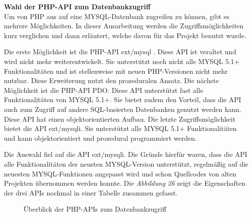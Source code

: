 \textbf{Wahl der PHP-API zum Datenbankzugriff}\\
Um von PHP aus auf eine MYSQL-Datenbank zugreifen zu können, gibt es mehrere Möglichkeiten. In dieser Ausarbeitung werden die Zugriffsmöglichkeiten kurz verglichen und dann erläutert, welche davon für das Projekt benutzt wurde.

Die erste Möglichkeit ist die PHP-API \glqq ext/mysql \grqq{}. Diese API ist veraltet und wird nicht mehr weiterentwickelt. Sie unterstützt noch nicht alle MYSQL 5.1+ Funktionalitäten und ist stellenweise mit neuen PHP-Versionen nicht mehr nutzbar. Diese Erweiterung nutzt den prozeduralen Ansatz. Die nächste Möglichkeit ist die PHP-API \glqq PDO\grqq{}. Diese API unterstützt fast alle Funktionalitäten von MYSQL 5.1+. Sie bietet zudem den Vorteil, dass die API auch zum Zugriff auf andere SQL-basierten Datenbanken genutzt werden kann. Diese API hat einen objektorientierten Aufbau.  Die letzte Zugriffsmöglichkeit bietet die API \glqq ext/mysqli\grqq{}. Sie unterstützt alle MYSQL 5.1+ Funktionalitäten und kann objektorientiert und prozedural programmiert werden.

Die Auswahl fiel auf die API \glqq ext/mysqli\grqq{}. Die Gründe hierfür waren, dass die API alle Funktionalitäten der neusten MYSQL-Version unterstützt, regelmäßig auf die neuesten MYSQL-Funktionen angepasst wird und schon Quellcodes von alten Projekten übernommen werden konnte. Die \textit{Abbildung 26} zeigt die Eigenschaften der drei APIs nochmal in einer Tabelle zusammen gefasst.
\begin{figure}[H]
	\begin{center}
	\end{center}
	\caption{Überblick der PHP-APIs zum Datenbankzugriff}
\end{figure}

